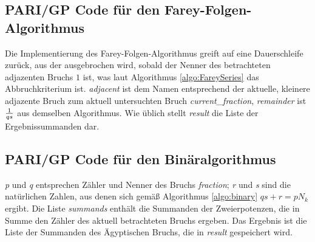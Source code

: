 \subsection{PARI/GP Code für den Farey-Folgen-Algorithmus}\label{code:fareyseries}
Die Implementierung des Farey-Folgen-Algorithmus greift auf eine Dauerschleife zurück, aus der ausgebrochen wird, sobald der Nenner des betrachteten adjazenten Bruchs $1$ ist, was laut Algorithmus \ref{algo:FareySeries} das Abbruchkriterium ist. \emph{adjacent} ist dem Namen entsprechend der aktuelle, kleinere adjazente Bruch zum aktuell untersuchten Bruch \emph{current\_fraction}, \emph{remainder} ist $\frac{1}{qs}$ aus demselben Algorithmus. Wie üblich stellt \emph{result} die Liste der Ergebnissummanden dar.


\subsection{PARI/GP Code für den Binäralgorithmus}
\emph{p} und \emph{q} entsprechen Zähler und Nenner des Bruchs \emph{fraction}; \emph{r} und \emph{s} sind die natürlichen Zahlen, aus denen sich gemäß Algorithmus \ref{algo:binary} $qs+r = pN_k$ ergibt. Die Liste \emph{summands} enthält die Summanden der Zweierpotenzen, die in Summe den Zähler des aktuell betrachteten Bruchs ergeben. Das Ergebnis ist die Liste der Summanden des Ägyptischen Bruchs, die in \emph{result} gespeichert wird.
